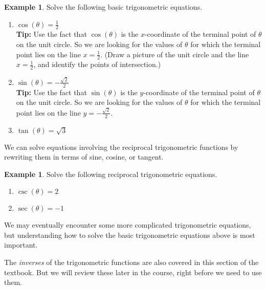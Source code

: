 \documentclass[letterpaper,12pt,oneside]{book}
\theoremstyle{definition}
\newtheorem{example}[theorem]{Example}
\begin{document}
{\begin{example}
Solve the following basic trigonometric equations.
\begin{enumerate}
\item $\cos(\theta)=\tfrac{1}{2}$ \\
\textbf{Tip:} Use the fact that $\cos(\theta)$ is the $x$-coordinate of the terminal point of $\theta$ on the unit circle.  So we are looking for the values of $\theta$ for which the terminal point lies on the line $x=\tfrac{1}{2}$.  (Draw a picture of the unit circle and the line $x=\tfrac{1}{2}$, and identify the points of intersection.)
\vfill
\item $\sin(\theta)=-\tfrac{\sqrt{2}}{2}$\\
\textbf{Tip:} Use the fact that $\sin(\theta)$ is the $y$-coordinate of the terminal point of $\theta$ on the unit circle.  So we are looking for the values of $\theta$ for which the terminal point lies on the line $y=-\tfrac{\sqrt{2}}{2}$.
\vfill
\newpage
\item $\tan(\theta)=\sqrt{3}$
\vfill
\end{enumerate}
\end{example}

We can solve equations involving the reciprocal trigonometric functions by rewriting them in terms of sine, cosine, or tangent.

\begin{example}
Solve the following reciprocal trigonometric equations.
\begin{enumerate}
\item $\csc(\theta)=2$ \\
\vfill
\item $\sec(\theta)=-1$\\
\vfill
\end{enumerate}
\end{example}

We may eventually encounter some more complicated trigonometric equations, but understanding how to solve the basic trigonometric equations above is most important.  

The \emph{inverses} of the trigonometric functions are also covered in this section of the textbook.  But we will review these later in the course, right before we need to use them.

}
\end{document}
